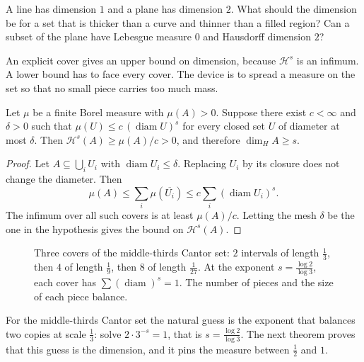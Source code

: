 \begin{think}
A line has dimension $1$ and a plane has dimension $2$. What should the dimension be for a set that is thicker than a curve and thinner than
a filled region? Can a subset of the plane have Lebesgue measure $0$ and Hausdorff dimension $2$?
\end{think}

An explicit cover gives an upper bound on dimension, because $\mathcal H^s$ is an infimum. A lower bound has to face every cover. The device
is to spread a measure on the set so that no small piece carries too much mass.

\begin{lemma}\label{lem:massdist}
Let $\mu$ be a finite Borel measure with $\mu(A)>0$. Suppose there exist $c<\infty$ and $\delta>0$ such that $\mu(U)\le c\,(\operatorname{diam}U)^s$ for
every closed set $U$ of diameter at most $\delta$. Then $\mathcal H^s(A)\ge\mu(A)/c>0$, and therefore $\dim_H A\ge s$.
\end{lemma}
\begin{proof}
Let $A\subseteq\bigcup_i U_i$ with $\operatorname{diam}U_i\le\delta$. Replacing $U_i$ by its closure does not change the diameter. Then
\[\mu(A)\le\sum_i\mu(\overline{U_i})\le c\sum_i(\operatorname{diam}U_i)^s.\]
The infimum over all such covers is at least $\mu(A)/c$. Letting the mesh $\delta$ be the one in the hypothesis gives the bound on
$\mathcal H^s(A)$.
\end{proof}

\begin{figure}[ht]
\centering
{}
\caption{Three covers of the middle-thirds Cantor set: $2$ intervals of length $\frac13$, then $4$ of length $\frac19$, then $8$ of length
$\frac1{27}$. At the exponent $s=\frac{\log 2}{\log 3}$, each cover has $\sum(\operatorname{diam})^s=1$. The number of pieces and the size of each piece
balance.}
\label{fig:cantorcover}
\end{figure}

For the middle-thirds Cantor set the natural guess is the exponent that balances two copies at scale $\frac13$: solve $2\cdot 3^{-s}=1$, that
is $s=\frac{\log 2}{\log 3}$. The next theorem proves that this guess is the dimension, and it pins the measure between $\frac12$ and $1$.

